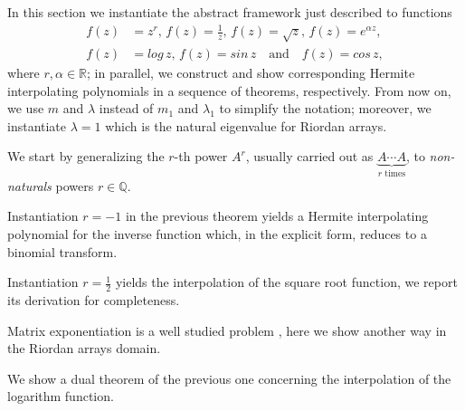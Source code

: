In this section we instantiate the abstract framework just described to functions
\begin{displaymath}
\begin{split}
f(z)&=z^{r},\,{f(z)=\frac{1}{z}},\,{f(z)=\sqrt{z}},\,{f(z)=e^{\alpha z}},\\
f(z)&=log\,{z},\,f(z)=sin\,{z}\quad\text{and}\quad f(z)=cos\,{z},
\end{split}
\end{displaymath}
where $r,\alpha\in\mathbb{R}$; in parallel, we construct and show corresponding
Hermite interpolating polynomials in a sequence of theorems, respectively.
From now on, we use $m$ and $\lambda$ instead of $m_{1}$ and $\lambda_{1}$ to
simplify the notation; moreover, we instantiate $\lambda=1$ which is the
natural eigenvalue for Riordan arrays.

We start by generalizing the $r$-th power $A^{r}$, usually carried out
as $\underbrace{A\cdots A}_{r\text{ times}}$, to \textit{non-naturals} powers
$r\in\mathbb{Q}$.



Instantiation $r=-1$ in the previous theorem yields a Hermite interpolating
polynomial for the inverse function which, in the explicit form, reduces to
a binomial transform.



Instantiation $r=\frac{1}{2}$ yields the interpolation of the square root function,
we report its derivation for completeness.



Matrix exponentiation is a well studied problem \citep{MOLERLOAN2003}, here
we show another way in the Riordan arrays domain.



We show a dual theorem of the previous one concerning the interpolation of the
logarithm function.



